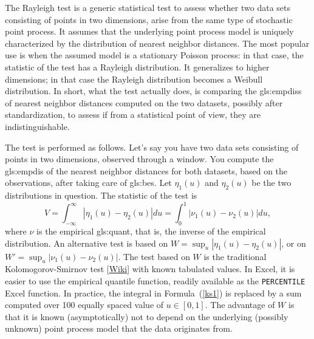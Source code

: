 \documentclass[10pt]{article}
\begin{document}

\noindent The \textcolor{index}{Rayleigh test} is a generic statistical test to assess whether two data sets consisting of points in two dimensions, arise from the same type of stochastic point process. It assumes that the underlying point process model is uniquely characterized by the distribution of nearest neighbor distances. The most popular use is when the assumed model is a stationary Poisson process: in that case, the statistic of the test has a
\textcolor{index}{Rayleigh distribution}.
It generalizes to higher dimensions; in that case the Rayleigh distribution becomes a
\textcolor{index}{Weibull distribution}. In short, what the test actually does, is comparing the
 \glspl{gls:empdis} of nearest neighbor distances computed on the two datasets,
possibly after \textcolor{index}{standardization}, to assess if from a statistical
point of view, they are indistinguishable.

The test is performed as follows. Let's say you have two data sets consisting of points in two dimensions, observed through a window. You compute the
 \gls{gls:empdis} of the nearest neighbor distances for both datasets, based on the observations, after taking care of \glspl{gls:be}. Let $\eta_1(u)$ and
$\eta_2(u)$ be the two distributions in question. The statistic of the test is
\begin{equation}
V=\int_{-\infty}^\infty |\eta_1(u) - \eta_2(u)| du = \int_{0}^1 |\nu_1(u) - \nu_2(u)| du, \label{ks1}
\end{equation}
where $\nu$ is the empirical \gls{gls:quant}, that is, the inverse of the empirical distribution. An alternative test is based on
$W=\sup_u |\eta_1(u) - \eta_2(u)|$, or on $W'=\sup_u |\nu_1(u) - \nu_2(u)|$. The test based on $W$ is the traditional Kolomogorov-Smirnov test
[\href{https://en.wikipedia.org/wiki/Kolmogorov-Smirnov_test}{Wiki}] with known tabulated values. In Excel, it is easier to use the empirical quantile function,
readily available as the \texttt{PERCENTILE} Excel function. In practice, the integral in Formula~(\ref{ks1}) is replaced by a sum computed over 100 equally spaced value of $u\in [0,1]$. The advantage of $W$ is that it is known (asymptotically) not to depend on the underlying (possibly unknown) point process model that the data originates from.
\end{document}
